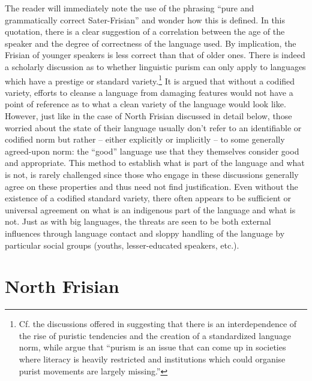 \documentclass[output=paper]{langsci/langscibook}
\begin{document}
The reader will immediately note the use of the phrasing “pure and grammatically correct Sater-Frisian” and wonder how this is defined. In this quotation, there is a clear suggestion of a correlation between the age of the speaker and the degree of correctness of the language used. By implication, the Frisian of younger speakers is less correct than that of older ones. There is indeed a scholarly discussion as to whether linguistic purism can only apply to languages which have a prestige or standard variety.\footnote{Cf. the discussions offered in \citet{VanderSijs1999} suggesting that there is an interdependence of the rise of puristic tendencies and the creation of a standardized language norm, while \citet[viii]{BrincatEtAl2003} argue that “purism is an issue that can come up in societies where literacy is heavily restricted and institutions which could organise purist movements are largely missing.”} It is argued that without a codified variety, efforts to cleanse a language from damaging features would not have a point of reference as to what a clean variety of the language would look like. However, just like in the case of North Frisian discussed in detail below, those worried about the state of their language usually don’t refer to an identifiable or codified norm but rather – either explicitly or implicitly – to some generally agreed-upon norm: the “good” language use that they themselves consider good and appropriate. This method to establish what is part of the language and what is not, is rarely challenged since those who engage in these discussions generally agree on these properties and thus need not find justification. Even without the existence of a codified standard variety, there often appears to be sufficient or universal agreement on what is an indigenous part of the language and what is not. Just as with big languages, the threats are seen to be both external influences through language contact and sloppy handling of the language by particular social groups (youths, lesser-educated speakers, etc.). 

\section{North Frisian}
\label{sec:gregersen:4}
\end{document}
